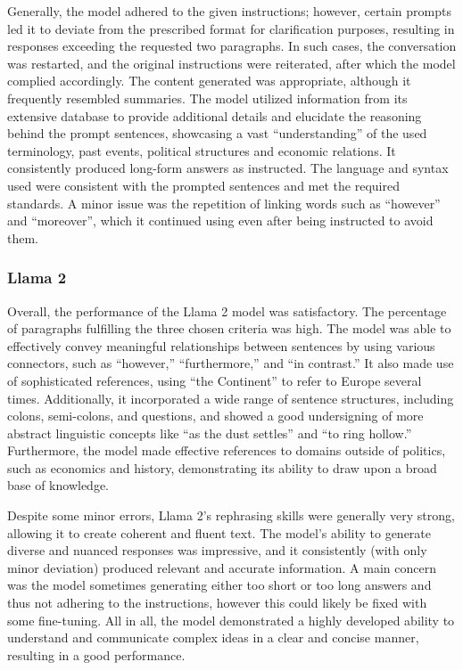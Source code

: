 \documentclass[fleqn,moreauthors,10pt]{ds_report}
\begin{document}
Generally, the model adhered to the given instructions; however, certain prompts led it to deviate from the prescribed format for clarification purposes, resulting in responses exceeding the requested two paragraphs. In such cases, the conversation was restarted, and the original instructions were reiterated, after which the model complied accordingly. The content generated was appropriate, although it frequently resembled summaries. The model utilized information from its extensive database to provide additional details and elucidate the reasoning behind the prompt sentences, showcasing a vast “understanding” of the used terminology, past events, political structures and economic relations. 
It consistently produced long-form answers as instructed. The language and syntax used were consistent with the prompted sentences and met the required standards. A minor issue was the repetition of linking words such as “however” and “moreover”, which it continued using even after being instructed to avoid them. 

\subsubsection*{Llama 2}
Overall, the performance of the Llama 2 model was satisfactory. The percentage of paragraphs fulfilling the three chosen criteria was high. The model was able to effectively convey meaningful relationships between sentences by using various connectors, such as “however,” “furthermore,” and “in contrast.” It also made use of sophisticated references, using “the Continent” to refer to Europe several times. Additionally, it incorporated a wide range of sentence structures, including colons, semi-colons, and questions, and showed a good undersigning of more abstract linguistic concepts like “as the dust settles” and “to ring hollow.” Furthermore, the model made effective references to domains outside of politics, such as economics and history, demonstrating its ability to draw upon a broad base of knowledge.

Despite some minor errors, Llama 2’s rephrasing skills were generally very strong, allowing it to create coherent and fluent text. The model’s ability to generate diverse and nuanced responses was impressive, and it consistently (with only minor deviation) produced relevant and accurate information. A main concern was the model sometimes generating either too short or too long answers and thus not adhering to the instructions, however this could likely be fixed with some fine-tuning. All in all, the model demonstrated a highly developed ability to understand and communicate complex ideas in a clear and concise manner, resulting in a good performance.
\end{document}
